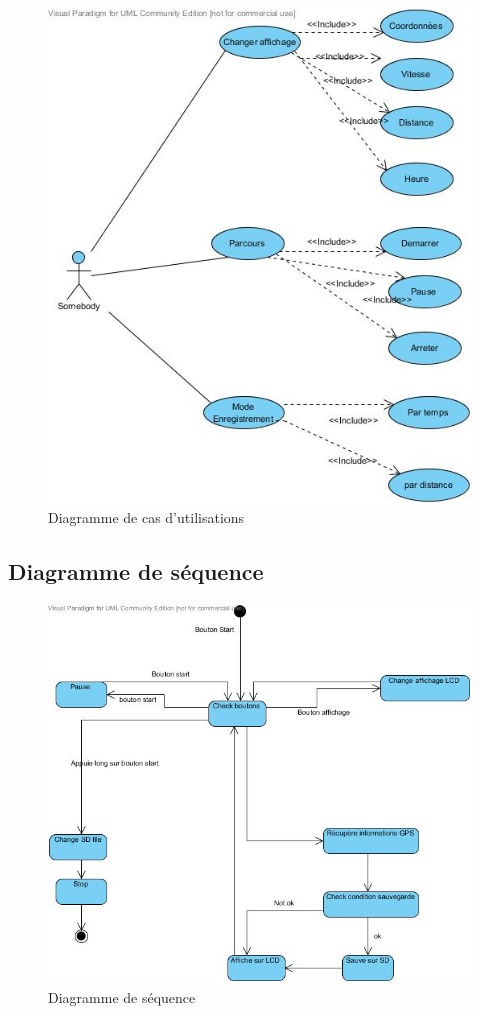 \documentclass[a4paper,12pt,titlepage]{article}
\begin{document}
\begin{figure}[H]
    \centering
    \includegraphics[width=\textwidth]{use_case.jpg}
    \caption{Diagramme de cas d'utilisations}
    \label{usecase}
\end{figure}

\subsection{Diagramme de séquence}

\begin{figure}[H]
    \centering
    \includegraphics[width=\textwidth]{sequence.jpg}
    \caption{Diagramme de séquence}
    \label{sequence}
\end{figure}
\end{document}
